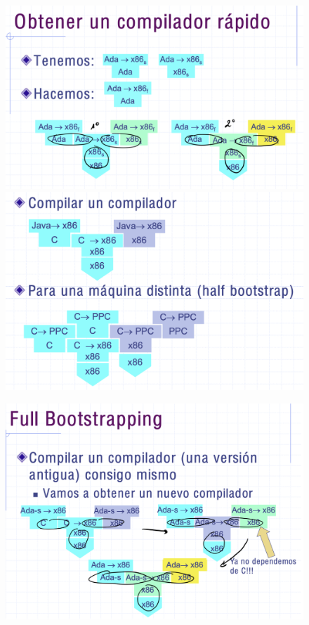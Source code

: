 \documentclass[12pt]{report} %
\begin{document}
\begin{figure}[H]
	{\includegraphics[scale=.15]{Untitled 22.png}
	\includegraphics[scale=.15]{Untitled 23.png}}
\end{figure}

\begin{figure}[H]
	{\includegraphics[scale=.2]{Untitled 24.png}}
\end{figure}
\end{document}
